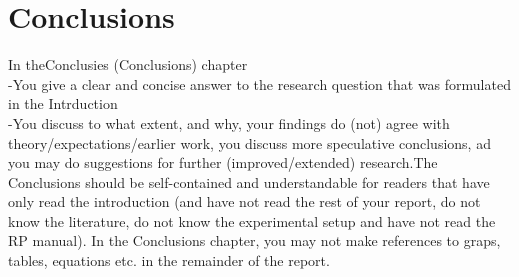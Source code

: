 \section{Conclusions}
In theConclusies (Conclusions) chapter\\-You give a clear and concise answer to the research question that was formulated in the Intrduction\\-You discuss  to  what  extent,  and  why,  your  findings  do  (not)  agree  with  theory/expectations/earlier  work,   you   discuss   more   speculative   conclusions,   ad   you   may   do   suggestions   for   further   (improved/extended) research.The  Conclusions  should  be  self-contained  and  understandable  for  readers  that  have  only  read  the  introduction  (and  have  not  read the  rest  of  your    report,  do  not  know  the  literature,  do  not  know  the  experimental  setup  and  have  not  read  the  RP  manual).   In  the  Conclusions  chapter,  you  may  not  make  references to graps, tables, equations etc. in the remainder of the report. 